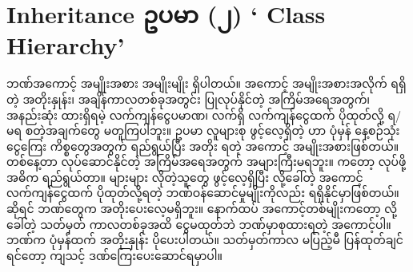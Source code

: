 \section{Inheritance ဥပမာ (၂) ‘ Class Hierarchy’}
ဘဏ်အကောင့် အမျိုးအစား အမျိုးမျိုး ရှိပါတယ်။ အကောင့် အမျိုးအစားအလိုက် ရရှိတဲ့ အတိုးနှုန်း၊ အချိန်ကာလတစ်ခုအတွင်း ပြုလုပ်နိုင်တဲ့  အကြိမ်အရေအတွက်၊ အနည်းဆုံး ထားရှိရမဲ့ လက်ကျန်ငွေပမာဏ၊ လက်ရှိ လက်ကျန်ငွေထက် ပိုထုတ်လို့ ရ/မရ  စတဲ့အချက်တွေ မတူကြပါဘူး။ ဥပမာ လူများစု ဖွင့်လေ့ရှိတဲ့  ဟာ ပုံမှန် နေ့စဉ်သုံး ငွေကြေး ကိစ္စတွေအတွက် ရည်ရွယ်ပြီး အတိုး  ရတဲ့ အကောင့် အမျိုးအစားဖြစ်တယ်။ တစ်နေ့တာ လုပ်ဆောင်နိုင်တဲ့  အကြိမ်အရေအတွက် အများကြီးမရဘူး။   ကတော့  လုပ်ဖို့ အဓိက ရည်ရွယ်တာ။  များများ လိုတဲ့သူတွေ ဖွင့်လေ့ရှိပြီး  လို့ခေါ်တဲ့ အကောင့် လက်ကျန်ငွေထက် ပိုထုတ်လို့ရတဲ့ ဘဏ်ဝန်ဆောင်မှုမျိုးကိုလည်း ရရှိနိုင်မှာဖြစ်တယ်။   ဆိုရင် ဘဏ်တွေက အတိုးပေးလေ့မရှိဘူး။ နောက်ထပ် အကောင့်တစ်မျိုးကတော့  လို့ခေါ်တဲ့ သတ်မှတ် ကာလတစ်ခုအထိ ငွေမထုတ်ဘဲ ဘဏ်မှာစုထားရတဲ့ အကောင့်ပါ။ ဘဏ်က ပုံမှန်ထက် အတိုးနှုန်း ပိုပေးပါတယ်။ သတ်မှတ်ကာလ မပြည့်မီ ပြန်ထုတ်ချင်ရင်တော့ ကျသင့် ဒဏ်ကြေးပေးဆောင်ရမှာပါ။


 
 
 
